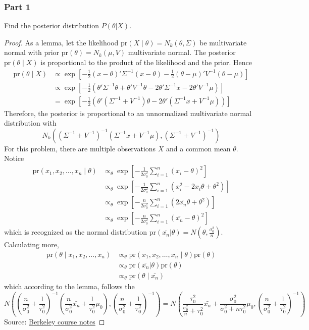 \documentclass[letterpaper, 12pt]{article}\usepackage[]{graphicx}\usepackage[]{color}
\newcommand{\pr}{\text{pr}}
\newcommand{\sbs}{\;|\;} %
\newcommand{\sion}{\sum_{i=1}^n}
\begin{document}
\subsubsection*{Part 1}
Find the posterior distribution $P(\theta | X)$.
\begin{proof}
As a lemma, let the likelihood $\pr(X \sbs \theta) = N_k(\theta, \Sigma)$ be multivariate normal with prior $\pr(\theta) = N_k(\mu, V)$ multivariate normal. The posterior $\pr(\theta \sbs X)$ is proportional to the product of the likelihood and the prior. Hence 
\begin{align}
\pr(\theta \sbs X) &\propto
\exp\left[-\frac{1}{2}(x-\theta)'\Sigma^{-1}(x-\theta) - 
\frac{1}{2}(\theta - \mu)'V^{-1}(\theta-\mu)\right]
\\
&\propto
\exp\left[
-\frac{1}{2}(\theta'\Sigma^{-1}\theta + \theta'V^{-1}\theta -2\theta'\Sigma^{-1}x -2\theta'V^{-1}\mu)
\right]
\\
&=
\exp\left[
-\frac{1}{2}
(\theta'(\Sigma^{-1} + V^{-1}) \theta
-2\theta'(\Sigma^{-1}x +V^{-1}\mu) )
\right]
\end{align}
Therefore, the posterior is proportional to an unnormalized multivariate normal distribution with 
\begin{equation}
N_k((\Sigma^{-1} + V^{-1})^{-1}(\Sigma^{-1}x +V^{-1}\mu), (\Sigma^{-1} + V^{-1})^{-1})
\end{equation}
For this problem, there are multiple observations $X$ and a common mean $\theta$. Notice
\begin{align}
\pr(x_1, x_2, \dots, x_n \sbs \theta) &\propto_\theta
\exp\left[
-\frac{1}{2 \sigma_0^2}
\sion(x_i - \theta)^2
\right]
\\
&\propto_\theta
\exp\left[
-\frac{1}{2 \sigma_0^2}
\sion(x_i^2 - 2x_i\theta + \theta^2)
\right]
\\
&\propto_\theta
\exp\left[
-\frac{n}{2 \sigma_0^2}
\sion(2\bar{x_n}\theta + \theta^2)
\right]
\\
&\propto_\theta
\exp\left[
-\frac{n}{2 \sigma_0^2}
\sion(\bar{x_n} - \theta)^2
\right]
\end{align}
which is recognized as the normal distribution $\pr(\bar{x_n}|\theta)=N(\theta, \frac{\sigma_0^2}{n})$. Calculating more,
\begin{align}
\pr(\theta \sbs x_1, x_2, \dots, x_n) &\propto_\theta 
\pr(x_1, x_2, \dots, x_n \sbs \theta) \pr(\theta)
\\
&\propto_\theta
\pr(\bar{x_n}|\theta) \pr(\theta)
\\
&\propto_\theta
\pr(\theta \sbs \bar{x_n})
\end{align}
which according to the lemma, follows the
\begin{equation}
N
\left(
\left(
\frac{n}{\sigma_0^2} + \frac{1}{\tau_0^2}
\right)^{-1}
\left(
\frac{n}{\sigma_0^2}\bar{x_n} + \frac{1}{\tau_0^2}\mu_0
\right), 
\left(
\frac{n}{\sigma_0^2} + \frac{1}{\tau_0^2}
\right)^{-1}
\right)
=
N
\left(
\frac{\tau_0^2}{\frac{\sigma_0^2}{n}+ \tau_0^2} \bar{x_n} +
\frac{\sigma_0^2}{\sigma_0^2+ n\tau_0^2} \mu_0,
\left(
\frac{n}{\sigma_0^2} + \frac{1}{\tau_0^2}
\right)
^{-1}
\right)
\end{equation}
Source: \href{http://www.cs.berkeley.edu/~jordan/courses/260-spring10/lectures/lecture5.pdf}{Berkeley course notes}
\end{proof}
\end{document}
